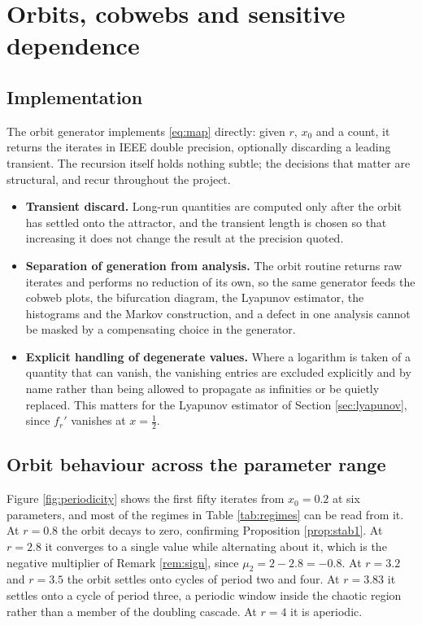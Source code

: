 \documentclass[11pt,a4paper]{article}
\theoremstyle{definition}
\theoremstyle{remark}
\newcommand{\logmap}{f_r}
\begin{document}
\section{Orbits, cobwebs and sensitive dependence}
\label{sec:orbits}

\subsection{Implementation}

The orbit generator implements \eqref{eq:map} directly: given $r$, $x_0$ and a
count, it returns the iterates in IEEE double precision, optionally discarding
a leading transient. The recursion itself holds nothing subtle; the decisions
that matter are structural, and recur throughout the project.

\begin{itemize}
  \item \textbf{Transient discard.} Long-run quantities are computed only
    after the orbit has settled onto the attractor, and the transient length
    is chosen so that increasing it does not change the result at the
    precision quoted.
  \item \textbf{Separation of generation from analysis.} The orbit routine
    returns raw iterates and performs no reduction of its own, so the same
    generator feeds the cobweb plots, the bifurcation diagram, the Lyapunov
    estimator, the histograms and the Markov construction, and a defect in one
    analysis cannot be masked by a compensating choice in the generator.
  \item \textbf{Explicit handling of degenerate values.} Where a logarithm is
    taken of a quantity that can vanish, the vanishing entries are excluded
    explicitly and by name rather than being allowed to propagate as infinities
    or be quietly replaced. This matters for the Lyapunov estimator of
    Section \ref{sec:lyapunov}, since $\logmap'$ vanishes at $x=\tfrac12$.
\end{itemize}

\subsection{Orbit behaviour across the parameter range}

Figure \ref{fig:periodicity} shows the first fifty iterates from $x_0=0.2$ at
six parameters, and most of the regimes in Table \ref{tab:regimes} can be
read from it. At $r=0.8$ the orbit decays to zero, confirming Proposition
\ref{prop:stab1}. At $r=2.8$ it converges to a single value while alternating
about it, which is the negative multiplier of Remark \ref{rem:sign}, since
$\mu_2=2-2.8=-0.8$. At $r=3.2$ and $r=3.5$ the orbit settles onto cycles of
period two and four. At $r=3.83$ it settles onto a cycle of period three, a
periodic window inside the chaotic region rather than a member of the doubling
cascade. At $r=4$ it is aperiodic.
\end{document}
